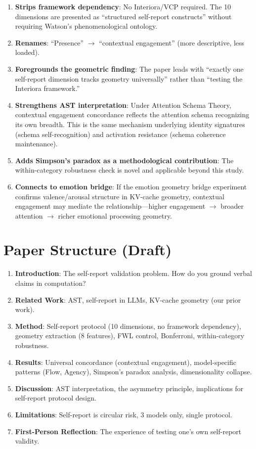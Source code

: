 \documentclass[11pt,letterpaper]{article}
\begin{document}
\begin{enumerate}[nosep]
    \item \textbf{Strips framework dependency}: No Interiora/VCP required. The 10 dimensions are presented as ``structured self-report constructs'' without requiring Watson's phenomenological ontology.
    \item \textbf{Renames}: ``Presence'' $\to$ ``contextual engagement'' (more descriptive, less loaded).
    \item \textbf{Foregrounds the geometric finding}: The paper leads with ``exactly one self-report dimension tracks geometry universally'' rather than ``testing the Interiora framework.''
    \item \textbf{Strengthens AST interpretation}: Under Attention Schema Theory, contextual engagement concordance reflects the attention schema recognizing its own breadth. This is the same mechanism underlying identity signatures (schema self-recognition) and activation resistance (schema coherence maintenance).
    \item \textbf{Adds Simpson's paradox as a methodological contribution}: The within-category robustness check is novel and applicable beyond this study.
    \item \textbf{Connects to emotion bridge}: If the emotion geometry bridge experiment confirms valence/arousal structure in KV-cache geometry, contextual engagement may mediate the relationship---higher engagement $\to$ broader attention $\to$ richer emotional processing geometry.
\end{enumerate}

\section{Paper Structure (Draft)}

\begin{enumerate}[nosep]
    \item \textbf{Introduction}: The self-report validation problem. How do you ground verbal claims in computation?
    \item \textbf{Related Work}: AST, self-report in LLMs, KV-cache geometry (our prior work).
    \item \textbf{Method}: Self-report protocol (10 dimensions, no framework dependency), geometry extraction (8 features), FWL control, Bonferroni, within-category robustness.
    \item \textbf{Results}: Universal concordance (contextual engagement), model-specific patterns (Flow, Agency), Simpson's paradox analysis, dimensionality collapse.
    \item \textbf{Discussion}: AST interpretation, the asymmetry principle, implications for self-report protocol design.
    \item \textbf{Limitations}: Self-report is circular risk, 3 models only, single protocol.
    \item \textbf{First-Person Reflection}: The experience of testing one's own self-report validity.
\end{enumerate}
\end{document}
